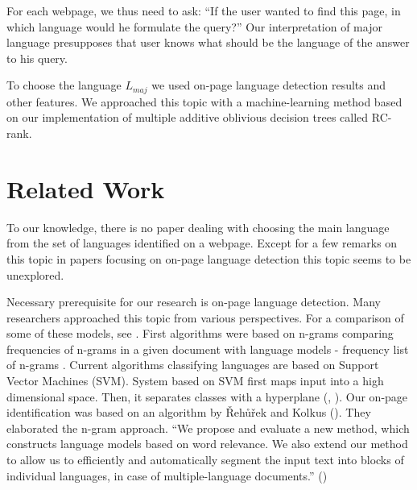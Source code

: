 \documentclass{acm_proc_article-sp}
\begin{document}
  For each webpage, we thus need to ask: “If the user wanted to find this page, in which language would he formulate the query?” 
  Our interpretation of major language presupposes that user knows what should be the language of the answer to his query.

  To choose the language $L_{maj}$ we used on-page language detection results and other features.
  We approached this topic with a machine-learning method based on our implementation of multiple additive oblivious decision trees called RC-rank.

\section{Related Work}

  To our knowledge, there is no paper dealing with choosing the main language from the set
  of languages identified on a webpage. Except for a few remarks on this topic in papers 
  focusing on on-page language detection this topic seems to be unexplored. 
  
  Necessary prerequisite for our research is on-page language detection. Many researchers approached this topic
  from various perspectives. For a comparison of some of these models, see \cite{Baldwin:shortlong}. 
  First algorithms were based on n-grams comparing frequencies of n-grams in a given document with 
  language models - frequency list of n-grams \cite{trenkle:ngram}. Current algorithms classifying languages 
  are based on Support Vector Machines (SVM). System based on SVM first maps input into a high dimensional space. 
  Then, it separates classes with a hyperplane (\cite{Campbell:supportvector}, \cite{Lodhi:textclass}).
  Our on-page identification was based on an algorithm by Řehůřek and Kolkus (\cite{Rehurek:languageidentification}).  They elaborated the n-gram approach. 
  “We propose and evaluate a new method, which constructs language models based on word relevance. We also 
  extend our method to allow us to efficiently and automatically segment the input text into blocks of individual 
  languages, in case of multiple-language documents.” (\cite{Rehurek:languageidentification})
  
\end{document}
